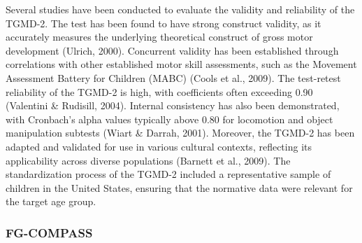\documentclass[
  man,
  colorlinks=true,linkcolor=blue,citecolor=blue,urlcolor=blue]{apa7}
\begin{document}
Several studies have been conducted to evaluate the validity and
reliability of the TGMD-2. The test has been found to have strong
construct validity, as it accurately measures the underlying theoretical
construct of gross motor development (Ulrich, 2000). Concurrent validity
has been established through correlations with other established motor
skill assessments, such as the Movement Assessment Battery for Children
(MABC) (Cools et al., 2009). The test-retest reliability of the TGMD-2
is high, with coefficients often exceeding 0.90 (Valentini \& Rudisill,
2004). Internal consistency has also been demonstrated, with Cronbach's
alpha values typically above 0.80 for locomotion and object manipulation
subtests (Wiart \& Darrah, 2001). Moreover, the TGMD-2 has been adapted
and validated for use in various cultural contexts, reflecting its
applicability across diverse populations (Barnett et al., 2009). The
standardization process of the TGMD-2 included a representative sample
of children in the United States, ensuring that the normative data were
relevant for the target age group.

\hypertarget{fg-compass}{%
\subsubsection{FG-COMPASS}\label{fg-compass}}
\end{document}
